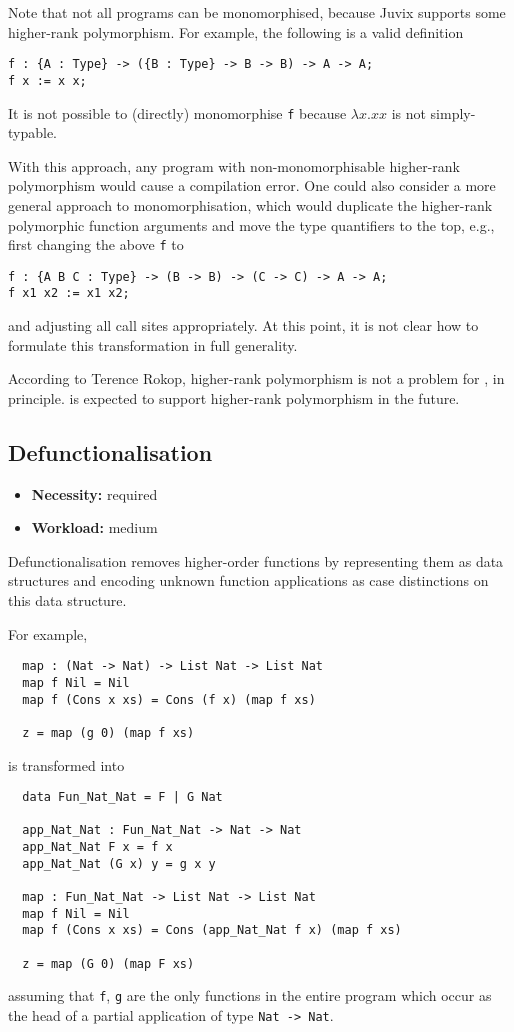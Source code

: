 \documentclass[final]{msc}
\begin{document}
\medskip

Note that not all \Juvix{} programs can be monomorphised, because Juvix
supports some higher-rank polymorphism. For example, the following is
a valid \Juvix{} definition
\begin{verbatim}
f : {A : Type} -> ({B : Type} -> B -> B) -> A -> A;
f x := x x;
\end{verbatim}
It is not possible to (directly) monomorphise \texttt{f} because
$\lambda x . x x$ is not simply-typable.

With this approach, any program with non-monomorphisable higher-rank
polymorphism would cause a compilation error. One could also consider
a more general approach to monomorphisation, which would duplicate the
higher-rank polymorphic function arguments and move the type
quantifiers to the top, e.g., first changing the above \texttt{f} to
\begin{verbatim}
f : {A B C : Type} -> (B -> B) -> (C -> C) -> A -> A;
f x1 x2 := x1 x2;
\end{verbatim}
and adjusting all call sites appropriately. At this point, it is not clear how to formulate this transformation in full generality.

According to Terence Rokop, higher-rank polymorphism is not a problem
for \Geb{}, in principle. \Geb{} is expected to support
higher-rank polymorphism in the future.

\subsection{Defunctionalisation}\label{sec_defunctionalisation}

\begin{itemize}
\item {\bf Necessity:} required
\item {\bf Workload:} medium
\end{itemize}

\noindent Defunctionalisation removes higher-order functions by
representing them as data structures and encoding unknown function
applications as case distinctions on this data structure.

\medskip

\noindent For example,
\begin{verbatim}
  map : (Nat -> Nat) -> List Nat -> List Nat
  map f Nil = Nil
  map f (Cons x xs) = Cons (f x) (map f xs)

  z = map (g 0) (map f xs)
\end{verbatim}
is transformed into
\begin{verbatim}
  data Fun_Nat_Nat = F | G Nat

  app_Nat_Nat : Fun_Nat_Nat -> Nat -> Nat
  app_Nat_Nat F x = f x
  app_Nat_Nat (G x) y = g x y

  map : Fun_Nat_Nat -> List Nat -> List Nat
  map f Nil = Nil
  map f (Cons x xs) = Cons (app_Nat_Nat f x) (map f xs)

  z = map (G 0) (map F xs)
\end{verbatim}
assuming that \texttt{f}, \texttt{g} are the only functions in the
entire program which occur as the head of a partial application of
type \texttt{Nat -> Nat}.
\end{document}
